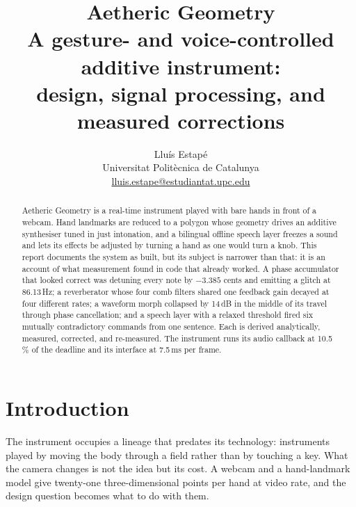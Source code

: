 \documentclass[a4paper,11pt]{article}
\begin{document}
\title{\vspace{-1.2em}\textbf{\LARGE Aetheric Geometry}\\[0.4em]
\large A gesture- and voice-controlled additive instrument:\\
design, signal processing, and measured corrections}

\author{Llu\'is Estap\'e\\
\small Universitat Polit\`ecnica de Catalunya\\
\small \href{mailto:lluis.estape@estudiantat.upc.edu}
            {lluis.estape@estudiantat.upc.edu}}

\date{}

\maketitle

\begin{abstract}
\noindent\small
Aetheric Geometry is a real-time instrument played with bare hands in front of
a webcam. Hand landmarks are reduced to a polygon whose geometry drives an
additive synthesiser tuned in just intonation, and a bilingual offline speech
layer freezes a sound and lets its effects be adjusted by turning a hand as one
would turn a knob. This report documents the system as built, but its subject
is narrower than that: it is an account of what measurement found in code that
already worked. A phase accumulator that looked correct was detuning every note
by $-3.385$ cents and emitting a glitch at 86.13\,Hz; a reverberator whose four
comb filters shared one feedback gain decayed at four different rates; a
waveform morph collapsed by 14\,dB in the middle of its travel through phase
cancellation; and a speech layer with a relaxed threshold fired six mutually
contradictory commands from one sentence. Each is derived analytically,
measured, corrected, and re-measured. The instrument runs its audio callback at
10.5\,\% of the deadline and its interface at 7.5\,ms per frame.
\end{abstract}

\section{Introduction}

The instrument occupies a lineage that predates its technology: instruments
played by moving the body through a field rather than by touching a key. What
the camera changes is not the idea but its cost. A webcam and a hand-landmark
model give twenty-one three-dimensional points per hand at video rate, and the
design question becomes what to do with them.
\end{document}
